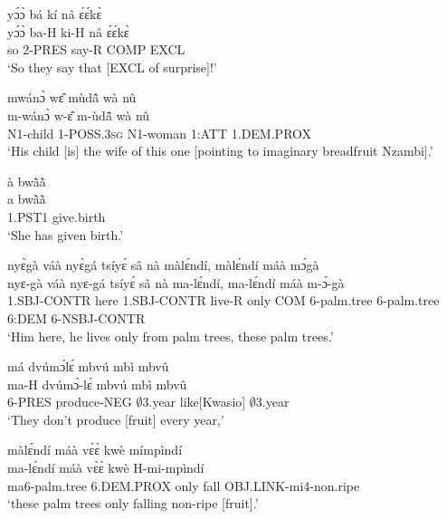\begin{exe} 
\exN\label{22}
  \glll  yɔ́ɔ̀ bá kí nâ ɛ́ɛ́kɛ̀ \\
            yɔ́ɔ̀ ba-H ki-H nâ ɛ́ɛ́kɛ̀ \\
         so 2-PRES say-R COMP EXCL \\
    \trans `So they say that [EXCL of surprise]!'
\end{exe}

\begin{exe} 
\exN\label{23}
  \glll  mwánɔ̀ wɛ̂ mùdã̂ wà nû \\
         m-wánɔ̀ w-ɛ̂ m-ùdã̂ wà nû \\
            N1-child 1-POSS.3\textsc{sg} N1-woman 1:ATT 1.DEM.PROX \\
    \trans `His child [is] the wife of this one [pointing to imaginary breadfruit Nzambi].'
\end{exe}

\begin{exe} 
\exN\label{24}
  \glll  à bwã̀ã̀ \\
         a bwã̀ã̀ \\
          1.PST1 give.birth \\
    \trans `She has given birth.'
\end{exe}

\begin{exe} 
\exN\label{25}
  \glll nyɛ̀gà váà nyɛ̀gá tsíyɛ́ sâ nà màlɛ́ndí, màlɛ́ndí máà mɔ́gà \\
         nyɛ-gà váà nyɛ-gá tsíyɛ́ sâ nà ma-lɛ́ndí, ma-lɛ́ndí máà m-ɔ́-gà \\
          1.SBJ-CONTR here 1.SBJ-CONTR live-R only COM 6-palm.tree 6-palm.tree 6:DEM 6-NSBJ-CONTR \\
    \trans `Him here, he lives only from palm trees, these palm trees.'
\end{exe}

\begin{exe} 
\exN\label{26} 
  \glll  má dvúmɔ́lɛ́ mbvú mbì mbvû \\
        ma-H dvúmɔ́-lɛ́ mbvú mbì mbvû \\
           6-PRES produce-NEG  $\emptyset$3.year like[Kwasio] $\emptyset$3.year \\
    \trans `They don't produce [fruit] every year,'
\end{exe}

\begin{exe} 
\exN\label{27} 
  \glll  màlɛ́ndí máà vɛ̀ɛ̀ kwè mímpìndí  \\
         ma-lɛ́ndí máà vɛ̀ɛ̀ kwè H-mi-mpìndí \\
           ma6-palm.tree 6.DEM.PROX only fall OBJ.LINK-mi4-non.ripe \\
    \trans `these palm trees only falling non-ripe [fruit].'
\end{exe}

